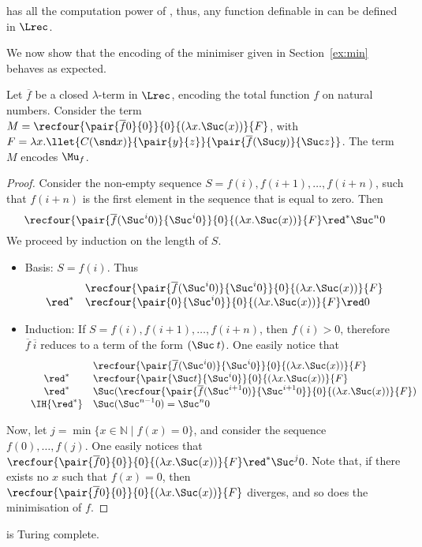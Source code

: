 \documentclass{article}
\begin{document}
\begin{corollary}
\LLCIrec has all the computation power of \LLCI, thus, any function definable in \ST can be defined in $\Lrec$.
\end{corollary}


We now show that the encoding of the minimiser given in Section~\ref{ex:min}
behaves as expected.

\begin{theorem}
\label{th:mincorrect}
Let $\overline{f}$ be a closed $\lambda$-term in $\Lrec$, encoding the 
total function $f$ on natural numbers. Consider the term $M=\recfour{\pair{\overline{f} 0}{0}}{0}{(\lambda x. \Suc(x))}{F}$, with $F = \lambda x. \llet {C (\snd x)}{\pair{y}{z}}{\pair{\overline{f} (\Suc y)}{\Suc z}}$. The term $M$ encodes $\Mu_f$.
\end{theorem}

\begin{proof}
Consider the non-empty sequence $S=f(i),f(i+1),\dots,f(i+n)$, such that
$f(i+n)$ is the first element in the sequence that is equal to
zero. Then $$\recfour{\pair{\overline{f} (\Suc^{i}0)}{\Suc^{i}0}}{0}{(\lambda x. \Suc(x))}{F} \red^* \Suc^{n}0$$ We proceed by induction on the length of $S$.
\begin{itemize}
\item Basis: $S = f(i)$. Thus 
\[
\begin{array}{cl}
  &\recfour{\pair{\overline{f}(\Suc^{i}0)}{\Suc^{i}0}}{0}{(\lambda x. \Suc(x))}{F}\\
 \red^* &\recfour{\pair{0}{\Suc^{i}0}}{0}{(\lambda x. \Suc(x))}{F} \red 0
\end{array}
\]
\item Induction: If $S=f(i),f(i+1),\dots,f(i+n)$, then $f(i) > 0$, therefore $\overline{f}\:\overline{i}$ reduces to a term of the form $(\Suc\: t)$. One easily notice that
\[
\begin{array}{cl}
 & \recfour{\pair{\overline{f} (\Suc^{i}0)}{\Suc^{i}0}}{0}{(\lambda x. \Suc(x))}{F} \\
\red^*& \recfour{\pair{\Suc t}{\Suc^{i}0}}{0}{(\lambda x. \Suc(x))}{F}\\
\red^*& \Suc(\recfour{\pair{\overline{f}(\Suc^{i+1}0)}{\Suc^{i+1}0}}{0}{(\lambda x. \Suc(x))}{F})\\
\IH{\red^*}& \Suc(\Suc^{n-1}0) = \Suc^{n}0\\
\end{array}
\]
\end{itemize}
Now, let $j = \min \{ x\in \mathbb{N} \mid f(x) = 0 \}$, and consider
the sequence $f(0),\dots,f(j)$. One easily notices that $\recfour{\pair{\overline{f} 0}{0}}{0}{(\lambda x. \Suc(x))}{F} \red^* \Suc^{j}0$. Note that, if there
exists no $x$ such that $f(x) = 0$, then $\recfour{\pair{\overline{f} 0}{0}}{0}{(\lambda x. \Suc(x))}{F}$ diverges, and so does the minimisation of $f$.
\end{proof}
\begin{corollary}
 \LLCIrec is Turing complete.
\end{corollary}
\end{document}
